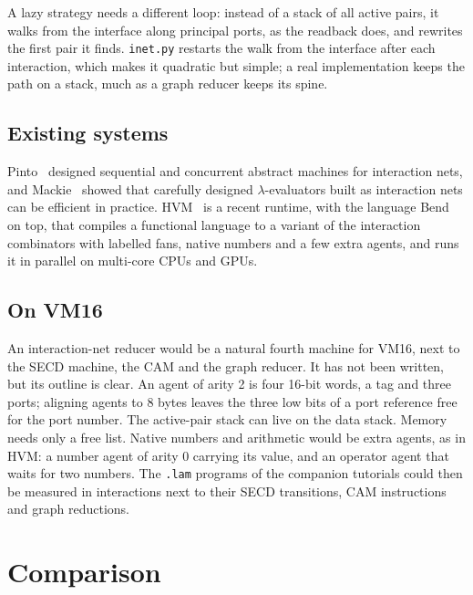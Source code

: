 \documentclass[11pt,a4paper]{article}
\theoremstyle{definition}
\theoremstyle{plain}
\begin{document}
A lazy strategy needs a different loop: instead of a stack of all active
pairs, it walks from the interface along principal ports, as the readback
does, and rewrites the first pair it finds. \texttt{inet.py} restarts the
walk from the interface after each interaction, which makes it quadratic but
simple; a real implementation keeps the path on a stack, much as a graph
reducer keeps its spine.

\subsection{Existing systems}

Pinto~\cite{pinto00} designed sequential and concurrent abstract machines for
interaction nets, and Mackie~\cite{mackie04} showed that carefully designed
$\lambda$-evaluators built as interaction nets can be efficient in
practice. HVM~\cite{hvm} is a recent runtime, with the language Bend
on top, that compiles a functional language to a variant of the interaction
combinators with labelled fans, native numbers and a few extra agents, and
runs it in parallel on multi-core CPUs and GPUs.

\subsection{On VM16}

An interaction-net reducer would be a natural fourth machine for VM16, next
to the SECD machine, the CAM and the graph reducer. It has not been written,
but its outline is clear. An agent of arity 2 is four 16-bit words, a tag and
three ports; aligning agents to 8 bytes leaves the three low bits of a port
reference free for the port number. The active-pair stack can live on the
data stack. Memory needs only a free list. Native numbers and arithmetic
would be extra agents, as in HVM: a number agent of arity 0 carrying its
value, and an operator agent that waits for two numbers. The \texttt{.lam}
programs of the companion tutorials could then be measured in interactions
next to their SECD transitions, CAM instructions and graph reductions.

\section{Comparison}\label{sec:comparison}
\end{document}
